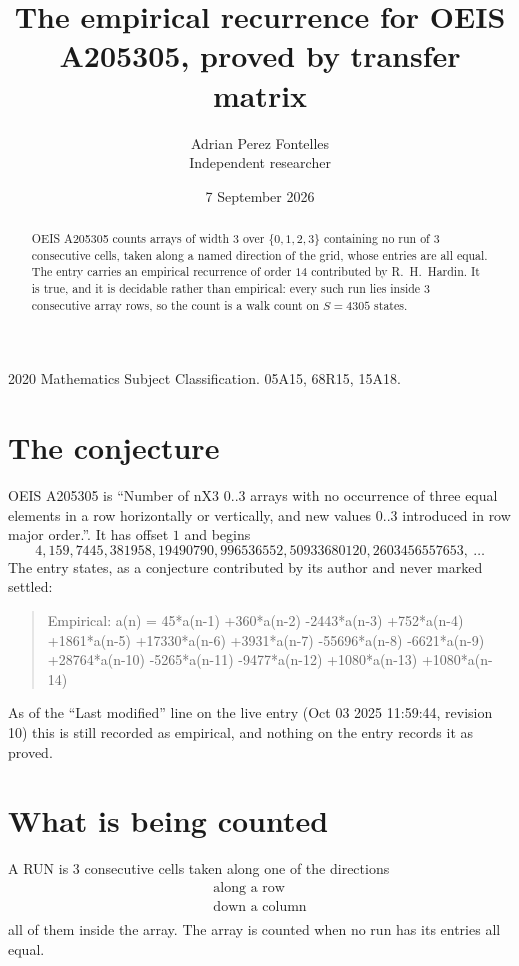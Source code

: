 \documentclass[11pt,a4paper]{article}
\title{The empirical recurrence for OEIS A205305, proved by transfer matrix}
\author{Adrian Perez Fontelles\\ \small Independent researcher}
\date{7 September 2026}
\theoremstyle{plain}
\theoremstyle{definition}
\begin{document}
\maketitle

\begin{abstract}
OEIS A205305 counts arrays of width $3$ over $\{0,1,2,3\}$ containing no run of $3$ consecutive
cells, taken along a named direction of the grid, whose entries are all equal. The entry carries
an empirical recurrence of order $14$ contributed by R.~H.~Hardin. It is true, and it is
decidable rather than empirical: every such run lies inside $3$ consecutive array rows, so
the count is a walk count on $S=4305$ states.
\end{abstract}

\noindent\small 2020 Mathematics Subject Classification. 05A15, 68R15, 15A18.\normalsize

\section{The conjecture}

OEIS A205305 is ``Number of nX3 0..3 arrays with no occurrence of three equal elements in a row horizontally or vertically, and new values 0..3 introduced in row major order.''. It has offset $1$ and begins
\[
4, 159, 7445, 381958, 19490790, 996536552, 50933680120, 2603456557653,\ \dots
\]
The entry states, as a conjecture contributed by its author and never marked settled:
\begin{quote}
Empirical: a(n) = 45*a(n-1) +360*a(n-2) -2443*a(n-3) +752*a(n-4) +1861*a(n-5) +17330*a(n-6) +3931*a(n-7) -55696*a(n-8) -6621*a(n-9) +28764*a(n-10) -5265*a(n-11) -9477*a(n-12) +1080*a(n-13) +1080*a(n-14)
\end{quote}
As of the ``Last modified'' line on the live entry (Oct 03 2025 11:59:44, revision 10) this is still
recorded as empirical, and nothing on the entry records it as proved.

\section{What is being counted}

A RUN is $3$ consecutive cells taken along one of the directions
\[
\begin{array}{l}
\text{along a row} \\
\text{down a column} \\
\end{array}
\]
all of them inside the array. The array is counted when no run has its entries all equal.
\end{document}
